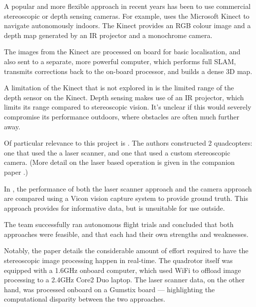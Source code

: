 \documentclass[12pt,oneside,a4paper]{book}
\begin{document}
A popular and more flexible approach in recent years has been to use
commercial stereoscopic or depth sensing cameras. For example,
\cite{huang2011visual} uses the Microsoft Kinect to navigate
autonomously indoors. The Kinect provides an RGB colour image and a
depth map generated by an IR projector and a monochrome camera.

The images from the Kinect are processed on board for basic
localisation, and also sent to a separate, more powerful computer,
which performs full SLAM, transmits corrections back to the on-board
processor, and builds a dense 3D map.

A limitation of the Kinect that is not explored in
\cite{huang2011visual} is the limited range of the depth sensor on the
Kinect. Depth sensing makes use of an IR projector, which limits its
range compared to stereoscopic vision. It's unclear if this would
severely compromise its performance outdoors, where obstacles are
often much further away.

Of particular relevance to this project is \cite{achtelik2009stereo}. The authors
constructed 2 quadcopters: one that used the a laser scanner, and one
that used a custom stereoscopic camera. (More detail on the laser
based operation is given in the companion paper
\cite{Bachrach09autonomousflight}.) 

In \cite{achtelik2009stereo}, the performance of both the laser
scanner approach and the camera approach are compared using a Vicon
vision capture system to provide ground truth. This approach provides
for informative data, but is unsuitable for use outside.

The team successfully ran autonomous flight trials and concluded that
both approaches were feasible, and that each had their own strengths
and weaknesses.

Notably, the paper details the considerable amount of effort required to have
the stereoscopic image processing happen in real-time. The quadrotor
itself was equipped with a 1.6GHz onboard computer, which used WiFi to
offload image processing to a 2.4GHz Core2 Duo laptop. The laser
scanner data, on the other hand, was processed onboard on a Gumstix
board --- highlighting the computational disparity between the two
approaches.

\end{document}

